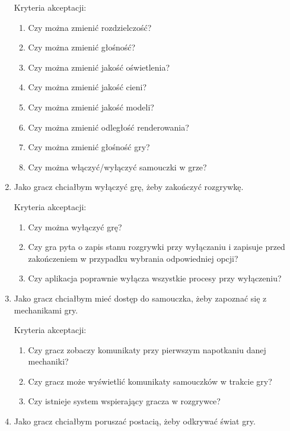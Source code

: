 \begin{enumerate}
        Kryteria akceptacji:
        \begin{enumerate}
            \item Czy można zmienić rozdzielczość?
            \item Czy można zmienić głośność?
            \item Czy można zmienić jakość oświetlenia?
            \item Czy można zmienić jakość cieni?
            \item Czy można zmienić jakość modeli?
            \item Czy można zmienić odległość renderowania?
            \item Czy można zmienić głośność gry?
            \item Czy można włączyć/wyłączyć samouczki w grze?
        \end{enumerate}
    
    \item Jako gracz chciałbym wyłączyć grę, żeby zakończyć rozgrywkę.
    
        Kryteria akceptacji:
        \begin{enumerate}
            \item Czy można wyłączyć grę?
            \item Czy gra pyta o zapis stanu rozgrywki przy wyłączaniu i zapisuje przed zakończeniem w przypadku wybrania odpowiedniej opcji?
            \item Czy aplikacja poprawnie wyłącza wszystkie procesy przy wyłączeniu?
        \end{enumerate}
        
    \item Jako gracz chciałbym mieć dostęp do samouczka, żeby zapoznać się z mechanikami gry.
    
        Kryteria akceptacji:
        \begin{enumerate}
            \item Czy gracz zobaczy komunikaty przy pierwszym napotkaniu danej mechaniki?
            \item Czy gracz może wyświetlić komunikaty samouczków w trakcie gry?
            \item Czy istnieje system wspierający gracza w rozgrywce?
        \end{enumerate}
        
    \item Jako gracz chciałbym poruszać postacią, żeby odkrywać świat gry.
    

\end{enumerate}
